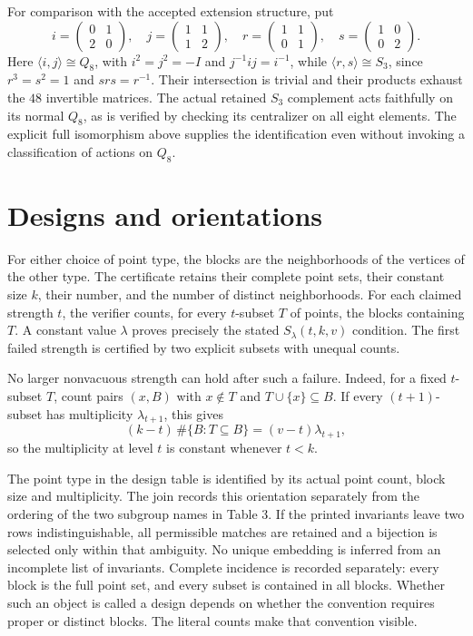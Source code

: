 \documentclass[11pt]{article}
\begin{document}
For comparison with the accepted extension structure, put
\[
 i=\begin{pmatrix}0&1\\2&0\end{pmatrix},\quad
 j=\begin{pmatrix}1&1\\1&2\end{pmatrix},\quad
 r=\begin{pmatrix}1&1\\0&1\end{pmatrix},\quad
 s=\begin{pmatrix}1&0\\0&2\end{pmatrix}.
\]
Here $\langle i,j\rangle\cong Q_8$, with $i^2=j^2=-I$ and
$j^{-1}ij=i^{-1}$, while $\langle r,s\rangle\cong S_3$, since
$r^3=s^2=1$ and $srs=r^{-1}$. Their intersection is trivial and their
products exhaust the $48$ invertible matrices. The actual retained
$S_3$ complement acts faithfully on its normal $Q_8$, as is verified
by checking its centralizer on all eight elements. The explicit full
isomorphism above supplies the identification even without invoking a
classification of actions on $Q_8$.

\section{Designs and orientations}
For either choice of point type, the blocks are the neighborhoods of the
vertices of the other type. The certificate retains their complete point
sets, their constant size $k$, their number, and the number of distinct
neighborhoods. For each claimed strength $t$, the verifier counts, for every
$t$-subset $T$ of points, the blocks containing $T$. A constant value
$\lambda$ proves precisely the stated $S_\lambda(t,k,v)$ condition.
The first failed strength is certified by two explicit subsets with
unequal counts.

No larger nonvacuous strength can hold after such a failure. Indeed, for
a fixed $t$-subset $T$, count pairs $(x,B)$ with $x\notin T$ and
$T\cup\{x\}\subseteq B$. If every $(t+1)$-subset has multiplicity
$\lambda_{t+1}$, this gives
\[
 (k-t)\,\#\{B:T\subseteq B\}=(v-t)\lambda_{t+1},
\]
so the multiplicity at level $t$ is constant whenever $t<k$.

The point type in the design table is identified by its actual point count,
block size and multiplicity. The join records this orientation separately
from the ordering of the two subgroup names in Table 3. If the printed
invariants leave two rows indistinguishable, all permissible matches are
retained and a bijection is selected only within that ambiguity. No unique
embedding is inferred from an incomplete list of invariants.
Complete incidence is recorded separately: every block is the full point
set, and every subset is contained in all blocks. Whether such an object is
called a design depends on whether the convention requires proper or
distinct blocks. The literal counts make that convention visible.
\end{document}
